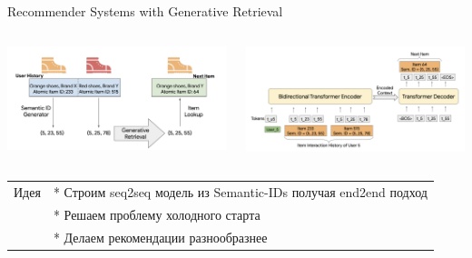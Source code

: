 \documentclass[11pt,aspectratio=169,handout]{beamer}
\begin{document}
\begin{frame}{Recommender Systems with Generative Retrieval \cite{rajput2023recommender}}

\begin{columns}
\begin{column}{0.5\textwidth} 
\begin{center}
\includegraphics[scale=0.15]{images/semantic_ids_seq.png}
\end{center}
\end{column}
\begin{column}{0.5\textwidth}
\begin{center}
\includegraphics[scale=0.3]{images/encoder_decoder_semantic.png}
\end{center}
\end{column}
\end{columns}

\vfill
\begin{small}
\begin{tabular}{l l}
Идея & * Строим seq2seq модель из Semantic-IDs получая end2end подход\\
& * Решаем проблему холодного старта\\
& * Делаем рекомендации разнообразнее
\end{tabular}
\end{small}

\end{frame}
\end{document}
